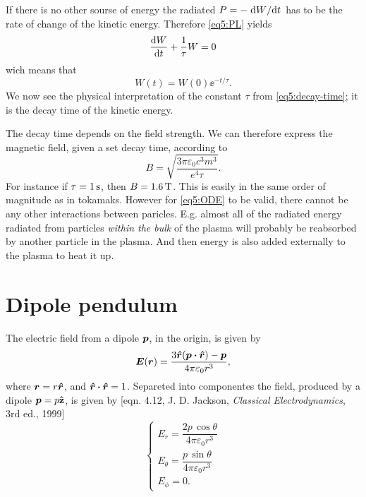 \documentclass[11pt,a4paper, 
swedish, english %
]{article}
\begin{document}
If there is no other sourse of energy the radiated $P=-\dv*{W}{t}$ has
to be the rate of change of the kinetic energy. Therefore
\eqref{eq5:PL} yields
\begin{equation}\label{eq5:ODE}
\dv{W}{t}+\frac{1}{\tau}W=0
\end{equation}
wich means that
\begin{equation}
W(t)=W(0)\ee^{-t/\tau}.
\end{equation}
We now see the physical interpretation of the constant $\tau$ from
\eqref{eq5:decay-time}; it is the decay time of the kinetic energy.

The decay time depends on the field strength. We can therefore express
the magnetic field, given a set decay time, according to
\begin{equation}
B=\sqrt{\frac{3\pi \varepsilon_0 c^3m^3}{e^4\tau}}.
\end{equation}
For instance if $\tau=\unit[1]{s}$, then $B=\unit[1.6]{T}$. This is
easily in the same order of magnitude as in tokamaks. However for  
\eqref{eq5:ODE} to be valid, there cannot be any other interactions
between paricles. E.g. almost all of the radiated energy radiated from
particles \emph{within the bulk} of the plasma will probably be
reabsorbed by another particle in the plasma. And then energy is also
added externally to the plasma to heat it up.


\section{Dipole pendulum}
The electric field from a dipole $\vb*p$, in the origin, is given by
\begin{equation}
\vb*E(\vb*r) = 
\frac{3\vu*r(\vb*p\vdot\vu*r)-\vb*p}{4\pi\varepsilon_0r^3},
\end{equation}
where $\vb*r=r\vu*r$, and $\vu*r\vdot\vu*r=1$. Separeted into
componentes the field, produced by a dipole $\vb*p=p\vu{z}$, is given
by [eqn. 4.12, J. D. Jackson, \textit{Classical Electrodynamics}, 3rd
ed., 1999]
\begin{equation}
\begin{cases}
E_r = \dfrac{2p\,\cos\theta}{4\pi\varepsilon_0 r^3}\\
E_\theta = \dfrac{p\,\sin\theta}{4\pi\varepsilon_0 r^3}\\
E_\phi=0.
\end{cases}
\end{equation}
\end{document}
